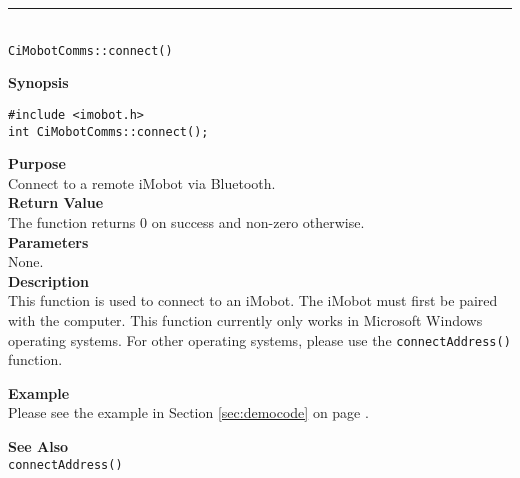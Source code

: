 \noindent
\vspace{5pt}
\rule{4.5in}{0.015in}\\
\noindent
{\LARGE \texttt{CiMobotComms::connect()}}\\
{}

\noindent
{\bf Synopsis}\\
\begin{verbatim}
#include <imobot.h>
int CiMobotComms::connect();
\end{verbatim}

\noindent
{\bf Purpose}\\
Connect to a remote iMobot via Bluetooth.\\

\noindent
{\bf Return Value}\\
The function returns 0 on success and non-zero otherwise.\\

\noindent
{\bf Parameters}\\
None.\\

\noindent
{\bf Description}\\
This function is used to connect to an iMobot. The iMobot must first be paired
with the computer. This function currently only works in Microsoft Windows
operating systems. For other operating systems, please use the
\texttt{connectAddress()} function.

\noindent
{\bf Example}\\
Please see the example in Section \ref{sec:democode} on page \pageref{sec:democode}.\\
\noindent

\noindent
{\bf See Also}\\
\texttt{connectAddress()}

